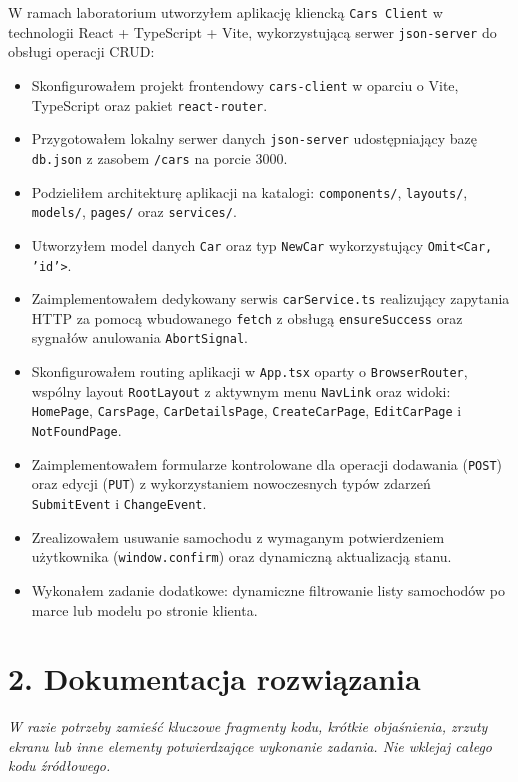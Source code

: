 \documentclass[11pt,a4paper]{article}
\begin{document}
\begin{tcolorbox}[colback=gray!2,colframe=gray!25,boxrule=0.5pt,arc=1mm]
W ramach laboratorium utworzyłem aplikację kliencką \texttt{Cars Client} w technologii React + TypeScript + Vite, wykorzystującą serwer \texttt{json-server} do obsługi operacji CRUD:
\begin{itemize}[leftmargin=*,itemsep=1pt,topsep=2pt]
    \item Skonfigurowałem projekt frontendowy \texttt{cars-client} w oparciu o Vite, TypeScript oraz pakiet \texttt{react-router}.
    \item Przygotowałem lokalny serwer danych \texttt{json-server} udostępniający bazę \texttt{db.json} z zasobem \texttt{/cars} na porcie 3000.
    \item Podzieliłem architekturę aplikacji na katalogi: \texttt{components/}, \texttt{layouts/}, \texttt{models/}, \texttt{pages/} oraz \texttt{services/}.
    \item Utworzyłem model danych \texttt{Car} oraz typ \texttt{NewCar} wykorzystujący \texttt{Omit<Car, 'id'>}.
    \item Zaimplementowałem dedykowany serwis \texttt{carService.ts} realizujący zapytania HTTP za pomocą wbudowanego \texttt{fetch} z obsługą \texttt{ensureSuccess} oraz sygnałów anulowania \texttt{AbortSignal}.
    \item Skonfigurowałem routing aplikacji w \texttt{App.tsx} oparty o \texttt{BrowserRouter}, wspólny layout \texttt{RootLayout} z aktywnym menu \texttt{NavLink} oraz widoki: \texttt{HomePage}, \texttt{CarsPage}, \texttt{CarDetailsPage}, \texttt{CreateCarPage}, \texttt{EditCarPage} i \texttt{NotFoundPage}.
    \item Zaimplementowałem formularze kontrolowane dla operacji dodawania (\texttt{POST}) oraz edycji (\texttt{PUT}) z wykorzystaniem nowoczesnych typów zdarzeń \texttt{SubmitEvent} i \texttt{ChangeEvent}.
    \item Zrealizowałem usuwanie samochodu z wymaganym potwierdzeniem użytkownika (\texttt{window.confirm}) oraz dynamiczną aktualizacją stanu.
    \item Wykonałem zadanie dodatkowe: dynamiczne filtrowanie listy samochodów po marce lub modelu po stronie klienta.
\end{itemize}
\end{tcolorbox}

\section*{\color{PSblue}2. Dokumentacja rozwiązania}
{\small\color{PSgray}\textit{W razie potrzeby zamieść kluczowe fragmenty kodu, krótkie objaśnienia, zrzuty ekranu lub inne elementy potwierdzające wykonanie zadania. Nie wklejaj całego kodu źródłowego.}}
\end{document}
